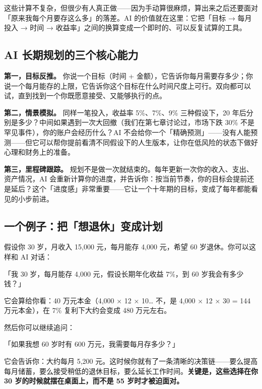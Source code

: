 \documentclass[a4paper,11pt,oneside,fontset=none,UTF8,zihao=-4]{ctexbook}
\begin{document}
这些计算不复杂，但很少有人真正做------因为手动算很麻烦，算出来之后还要面对「原来我每个月要存这么多」的落差。AI
的价值就在这里：它把「目标 → 每月投入 → 时间 →
收益率」之间的换算变成一个即时的、可以反复试算的工具。

\subsection{AI
长期规划的三个核心能力}\label{ai-ux957fux671fux89c4ux5212ux7684ux4e09ux4e2aux6838ux5fc3ux80fdux529b}

\textbf{第一，目标反推。} 你说一个目标（时间 +
金额），它告诉你每月需要存多少；你说一个每月能存的上限，它告诉你这个目标在什么时间尺度上可行。双向都可以试，直到找到一个你既愿意接受、又能够执行的点。

\textbf{第二，情景模拟。} 同样一笔投入，收益率 5\%、7\%、9\%
三种假设下，20
年后分别是多少？中间如果遇到一次大回撤（我们在第七章讨论过，市场下跌
30\% 不是罕见事件），你的账户会经历什么？AI
不会给你一个「精确预测」------没有人能预测------但它可以帮你提前看清不同假设下的人生版本，让你在低风险的状态下做好心理和财务上的准备。

\textbf{第三，里程碑跟踪。}
规划不是做一次就结束的。每年更新一次你的收入、支出、资产情况，AI
会重新计算你的进度，并告诉你：按当前节奏，你的目标会提前还是延后？这个「进度感」非常重要------它让一个十年期的目标，变成了每年都能看见的小步前进。

\subsection{一个例子：把「想退休」变成计划}\label{ux4e00ux4e2aux4f8bux5b50ux628aux60f3ux9000ux4f11ux53d8ux6210ux8ba1ux5212}

假设你 30 岁，月收入 15,000 元，每月能存 4,000 元，希望 60
岁退休。你可以这样和 AI 对话：

\begin{dhquote}
「我 30 岁，每月能存 4,000 元，假设长期年化收益 7\%，到 60
岁我会有多少钱？」
\end{dhquote}

它会算给你看：40 万元本金（4,000 × 12 × 10\ldots{} 不，是 4,000 × 12 ×
30 = 144 万元本金），在 7\% 复利下大约会变成 480 万元左右。

然后你可以继续追问：

\begin{dhquote}
「如果我想 60 岁时有 600 万元，我需要每月存多少？」
\end{dhquote}

它会告诉你：大约每月 5,200
元。这时候你就有了一条清晰的决策链------要么提高每月储蓄，要么接受稍低的退休目标，要么延长工作时间。\textbf{关键是，这些选择在你
30 岁的时候就摆在桌面上，而不是 55 岁时才被迫面对。}
\end{document}

